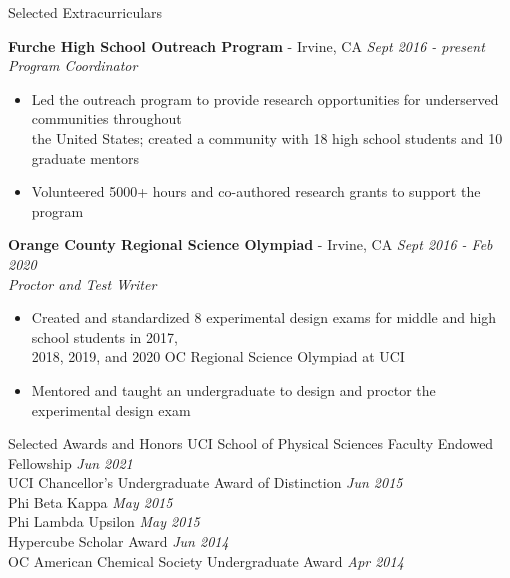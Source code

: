 \documentclass{resume} %
\begin{document}
\begin{rSection}{Selected Extracurriculars}

  {\bf Furche High School Outreach Program} - Irvine, CA \hfill {\em Sept 2016 - present} \\
  {\textit{Program Coordinator}}
  \vspace{-0.5em}
  \begin{itemize}
    \itemsep-0.75em
  \item Led the outreach program to provide research opportunities for underserved communities
    throughout \\
    the United States; created a community with 18 high school students and 10 graduate mentors
  \item Volunteered 5000+ hours and co-authored research grants to support the program
  \end{itemize}

  {\bf Orange County Regional Science Olympiad} - Irvine, CA \hfill {\em Sept 2016 - Feb 2020}  \\
  {\textit{Proctor and Test Writer}}
  \vspace{-0.5em}
  \begin{itemize}
  \itemsep-0.75em
  \item Created and standardized 8 experimental design exams for middle and high school students in
    2017, \\
    2018, 2019, and 2020 OC Regional Science Olympiad at UCI
  \item Mentored and taught an undergraduate to design and proctor the experimental design exam
  \end{itemize}

\end{rSection}

\begin{rSection}{Selected Awards and Honors}
  UCI School of Physical Sciences Faculty Endowed Fellowship \hfill {\em Jun 2021} \\
  UCI Chancellor's Undergraduate Award of Distinction \hfill {\em Jun 2015} \\
  Phi Beta Kappa \hfill {\em May 2015} \\
  Phi Lambda Upsilon \hfill {\em May 2015} \\
  Hypercube Scholar Award \hfill {\em Jun 2014} \\
  OC American Chemical Society Undergraduate Award \hfill {\em Apr 2014}
\end{rSection}
\end{document}
